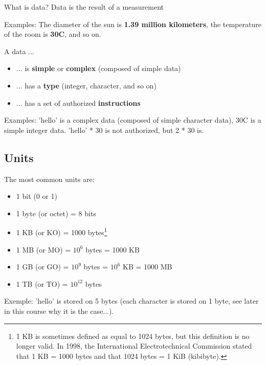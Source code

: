 \documentclass[handout]{beamer}[10pt, usepdftitle=false]
\begin{document}
    \begin{frame}[label=(first)]
	
	\begin{block}{What is data?}
	Data is the result of a measurement
	\end{block}	
			
	Examples: The diameter of the sun is \textbf{1.39 million kilometers}, the temperature of the room is \textbf{30\degree C}, and so on.
	
	\hfill\break
			
	A data ...
			
	\begin{itemize}
	\item {... is \textbf{simple} or \textbf{complex} (composed of simple data)}	
	\item {... has a \textbf{type} (integer, character, and so on)}
	\item {... has a set of authorized \textbf{instructions}}
	\end{itemize}
	
	Examples: 'hello' is a complex data (composed of simple character data), 30\degree C is a simple integer data. 'hello' * 30 is not authorized, but 2 * 30 is.
		 
			
    \end{frame}

	\subsection{Units}	

    \begin{frame}
    
	The most common units are: 
	\begin{itemize}
		\item{1 bit (0 or 1)}
		\item{1 byte (or octet) = 8 bits}
		\item{1 KB (or KO) = 1000 bytes\footnote{1 KB is sometimes defined as equal to 1024 bytes, but this definition is no longer valid. In 1998, the International Electrotechnical Commission stated that 1 KB = 1000 bytes and that 1024 bytes = 1 KiB (kibibyte).}}
		\item{1 MB (or MO) = $10^6$ bytes = 1000 KB}
		\item{1 GB (or GO) = $10^9$ bytes = $10^6$ KB = 1000 MB}
		\item{1 TB (or TO) = $10^{12}$ bytes}
	\end{itemize}	 
    
   	Exemple: 'hello' is stored on 5 bytes (each character is stored on 1 byte, see later in this course why it is the case...).
            
	\end{frame}    
	
\end{document}
